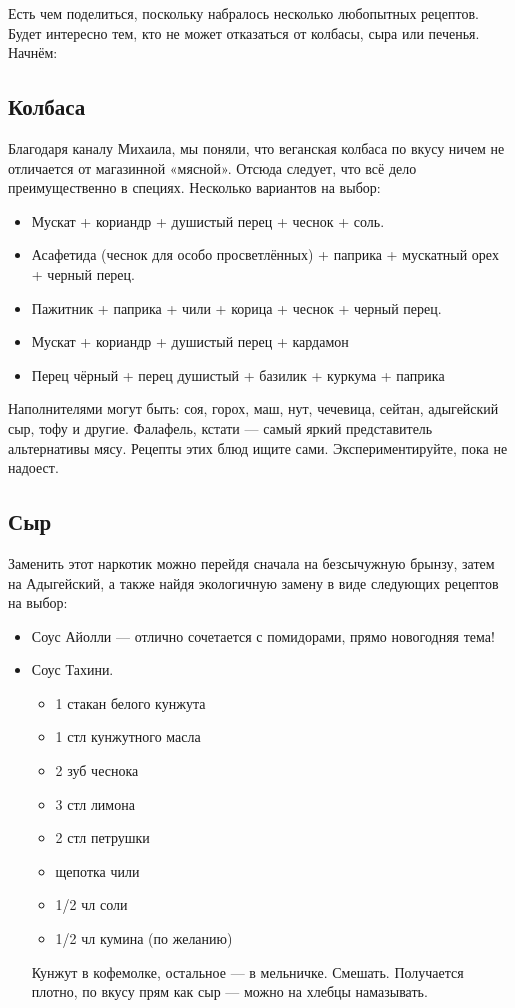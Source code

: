 Есть чем поделиться, поскольку набралось несколько любопытных рецептов. Будет интересно тем, кто не может отказаться от колбасы, сыра или печенья. Начнём:

\subsection{Колбаса}

Благодаря каналу Михаила, мы поняли, что веганская колбаса по вкусу ничем не отличается от магазинной «мясной». Отсюда следует, что всё дело преимущественно в специях. Несколько вариантов на выбор:

\begin{itemize}
\item Мускат + кориандр + душистый перец + чеснок + соль.
\item Асафетида (чеснок для особо просветлённых) + паприка + мускатный орех + черный перец.
\item Пажитник + паприка + чили + корица + чеснок + черный перец.
\item Мускат + кориандр + душистый перец + кардамон
\item Перец чёрный + перец душистый + базилик + куркума + паприка
\end{itemize}
Наполнителями могут быть: соя, горох, маш, нут, чечевица, сейтан, адыгейский сыр, тофу и другие. Фалафель, кстати — самый яркий представитель альтернативы мясу. Рецепты этих блюд ищите сами. Экспериментируйте, пока не надоест.

\subsection{Сыр}

Заменить этот наркотик можно перейдя сначала на безсычужную брынзу, затем на Адыгейский, а также найдя экологичную замену в виде следующих рецептов на выбор:
\begin{itemize}
\item Соус Айолли — отлично сочетается с помидорами, прямо новогодняя тема!%

\item Соус Тахини.%
    \begin{itemize}
\item 1 стакан белого кунжута 
\item 1 стл кунжутного масла
\item 2 зуб чеснока
\item 3 стл лимона
\item 2 стл петрушки
\item щепотка чили
\item 1/2 чл соли
\item 1/2 чл кумина (по желанию)
\end{itemize}
Кунжут в кофемолке, остальное — в мельничке. Смешать. Получается плотно, по вкусу прям как сыр — можно на хлебцы намазывать.

\end{itemize}



